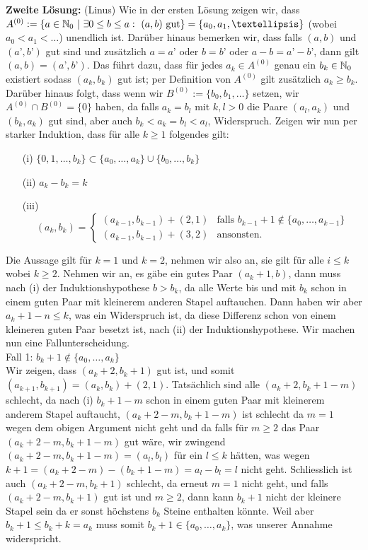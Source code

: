 \textbf{Zweite Lösung:} (Linus)
Wie in der ersten Lösung zeigen wir, dass $A^{(0)}:=\{a\in\N_0\ |\ \exists 0\leq b\leq a:\ (a,b)\text{ gut}\}=\{a_0,a_1,…\}$ (wobei $a_0<a_1<…$) unendlich ist. Darüber hinaus bemerken wir, dass falls $(a,b)$ und $(a’,b’)$ gut sind und zusätzlich $a=a’$ oder $b=b’$ oder $a-b=a’-b’$, dann gilt $(a,b)=(a’,b’)$. Das führt dazu, dass für jedes $a_k\in A^{(0)}$ genau ein $b_k\in\mathbb{N}_0$ existiert sodass $(a_k,b_k)$ gut ist; per Definition von $A^{(0)}$ gilt zusätzlich $a_k\geq b_k$. Darüber hinaus folgt, dass wenn wir $B^{(0)}:=\{b_0,b_1,…\}$ setzen, wir $A^{(0)}\cap B^{(0)}=\{0\}$ haben, da falls $a_k=b_l$ mit $k,l>0$ die Paare $(a_l,a_k)$ und $(b_k,a_k)$ gut sind, aber auch $b_k<a_k=b_l<a_l$, Widerspruch. Zeigen wir nun per starker Induktion, dass für alle $k\geq 1$ folgendes gilt:
\begin{enumerate}
\item[(i)] $\{0,1,…,b_k\}\subset\{a_0,…,a_k\}\cup\{b_0,…,b_k\}$
\item[(ii)] $a_k-b_k=k$
\item[(iii)] $$
(a_k,b_k)=
\begin{cases}
(a_{k-1},b_{k-1})+(2,1) & \text{falls } b_{k-1}+1\notin\{a_0,…,a_{k-1}\}\\
(a_{k-1},b_{k-1})+(3,2) & \text{ansonsten.}
\end{cases}
$$
\end{enumerate}
Die Aussage gilt für $k=1$ und $k=2$, nehmen wir also an, sie gilt für alle $i\leq k$ wobei $k\geq 2$. Nehmen wir an, es gäbe ein gutes Paar $(a_k+1,b)$, dann muss nach (i) der Induktionshypothese $b>b_k$, da alle Werte bis und mit $b_k$ schon in einem guten Paar mit kleinerem anderen Stapel auftauchen. Dann haben wir aber $a_k+1-n\leq k$, was ein Widerspruch ist, da diese Differenz schon von einem kleineren guten Paar besetzt ist, nach (ii) der Induktionshypothese. Wir machen nun eine Fallunterscheidung.\\
Fall 1: $b_k+1\notin\{a_0,…,a_k\}$\\
Wir zeigen, dass $(a_k+2,b_k+1)$ gut ist, und somit $(a_{k+1},b_{k+1})=(a_k,b_k)+(2,1)$. Tatsächlich sind alle $(a_k+2,b_k+1-m)$ schlecht, da nach (i) $b_k+1-m$ schon in einem guten Paar mit kleinerem anderem Stapel auftaucht, $(a_k+2-m,b_k+1-m)$ ist schlecht da $m=1$ wegen dem obigen Argument nicht geht und da falls für $m\geq 2$ das Paar $(a_k+2-m,b_k+1-m)$ gut wäre, wir zwingend $(a_k+2-m,b_k+1-m)=(a_l,b_l)$ für ein $l\leq k$ hätten, was wegen $k+1=(a_k+2-m)-(b_k+1-m)=a_l-b_l=l$ nicht geht. Schliesslich ist auch $(a_k+2-m,b_k+1)$ schlecht, da erneut $m=1$ nicht geht, und falls $(a_k+2-m,b_k+1)$ gut ist und $m\geq 2$, dann kann $b_k+1$ nicht der kleinere Stapel sein da er sonst höchstens $b_k$ Steine enthalten könnte. Weil aber $b_k+1\leq b_k+k=a_k$ muss somit $b_k+1\in\{a_0,…,a_k\}$, was unserer Annahme widerspricht.\\
